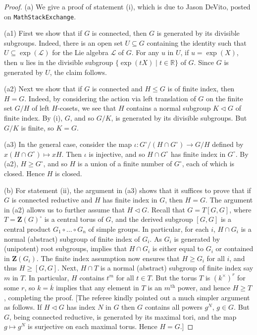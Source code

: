 \documentclass[11pt]{amsart}
\theoremstyle{plain}
\theoremstyle{definition}
\numberwithin{thm}{section}
\numberwithin{equation}{thm}
\newcommand{\sL}{{\mathcal L}}
\newcommand{\R}{{\mathbb R}}
\newcommand{\0}{\emptyset}
\newcommand{\ZB}{{\mathbf Z}}
\begin{document}
\begin{proof}
(a) We give a proof of statement (i), which is due to Jason DeVito, posted on {\tt MathStack\-Exchange}.

\smallskip
(a1) First we show that if $G$ is connected, then $G$ is generated by its divisible subgroups.  Indeed, there is an open set 
$U \subseteq G$ containing the identity such that $U \subseteq \exp(\sL)$ for the Lie algebra $\sL$ of $G$. For any $u$ in $U$, if 
$u = \exp(X)$, then $u$ lies in the divisible subgroup $\{\exp(tX) \mid t \in \R\}$ of $G$. Since $G$ is generated by $U$, the claim follows.

\smallskip 
(a2) Next we show that if $G$ is connected and $H \leq G$ is of finite index, then $H=G$.  Indeed, by considering the action 
via left translation of $G$ on the finite set $G/H$ of left $H$-cosets, we see that $H$ contains a normal subgroup $K \lhd G$
of finite index. By (i), $G$, and so $G/K$, is generated by its divisible subgroups. But $G/K$ is finite, so $K=G$.

\smallskip
(a3) In the general case, consider the map $\iota: G^\circ/(H \cap G^\circ) \to G/H$ defined by $x(H \cap G^\circ) \mapsto xH$. Then 
$\iota$ is injective, and so $H \cap G^\circ$ has finite index in $G^\circ$. By (a2), $H \geq G^\circ$, and so $H$ is a union of 
a finite number of $G^\circ$, each of which is closed. Hence $H$ is closed. 

\smallskip
(b) For statement (ii), 
the argument in (a3) shows that it suffices to prove that if $G$ is connected reductive and $H$ has 
finite index in $G$, then $H=G$. The argument in (a2) allows us to further assume that $H \lhd G$. 
Recall \cite[p. 16]{C} that $G=T[G,G]$, where $T = \ZB(G)^\circ$ is a central torus of $G$, and the derived subgroup
$[G,G]$ is a central product $G_1 \circ \ldots \circ G_n$ of simple groups. In particular, for each $i$, $H \cap G_i$ is a normal
(abstract) subgroup of finite index of $G_i$. As $G_i$ is generated by (unipotent) root subgroups, \cite[Main Theorem]{Ti} implies
that $H \cap G_i$ is either equal to $G_i$ or contained in $\ZB(G_i)$. The finite index assumption now ensures that $H \geq G_i$ for
all $i$, and thus $H \geq [G,G]$. Next, $H \cap T$ is a normal (abstract) subgroup of finite index say $m$ in $T$. In particular,
$H$ contains $t^m$ for all $t \in T$. But the torus $T$ is $(k^\times)^r$ for some $r$, so $k = \overline{k}$ implies that any element
in $T$ is an $m^{\mathrm{th}}$ power, and hence $H \geq T$, completing the proof.
[The referee kindly pointed out a much simpler argument as follows. If $H \lhd G$ has index $N$ in $G$ then $G$ contains all powers $g^N$, $g \in G$. But $G$, being connected reductive, is generated by its maximal tori, and the map $g \mapsto g^N$ is 
surjective on each maximal torus. Hence $H=G$.] 
\end{proof}
\end{document}
